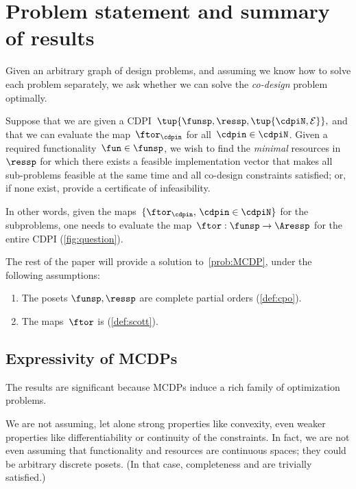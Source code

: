 

\section{Problem statement and summary of results}
\label{sec:Optimization}

Given an arbitrary graph of design problems, and assuming we know
how to solve each problem separately, we ask whether we can solve
the \emph{co-design} problem optimally.
\begin{problem}
    \label{prob:MCDP}Suppose that we are given a CDPI~$\tup{ \funsp,\ressp,\tup{ \cdpiN,\mathcal{E}} } ,$
    and that we can evaluate the map~$\ftor_{\cdpin}$ for all~$\cdpin\in\cdpiN$.
    Given a required functionality~$\fun\in\funsp$, we wish to find
    the \emph{minimal} resources in~$\ressp$ for which there exists
    a feasible implementation vector that makes all sub-problems feasible
    at the same time and all co-design constraints satisfied; or, if
    none exist, provide a certificate of infeasibility.
\end{problem}
In other words, given the maps~$\{\ftor_{\cdpin},\,\cdpin\in\cdpiN\}$
for the subproblems, one needs to evaluate the map~$\ftor:\funsp\rightarrow\Aressp$
for the entire CDPI (\cref{fig:question}).


The rest of the paper will provide a solution to~\cref{prob:MCDP},
under the following assumptions:

\begin{enumerate}
    \item The posets $\funsp,\ressp$ are complete partial orders (\cref{def:cpo}).
    \item The maps~$\ftor$ is \scottcontinuous (\cref{def:scott}).
\end{enumerate}

\subsection{Expressivity of MCDPs}

The results are significant because MCDPs induce a rich family of
optimization problems.

We are not assuming, let alone strong properties like convexity, even
weaker properties like differentiability or continuity of the constraints.
In fact, we are not even assuming that functionality and resources
are continuous spaces; they could be arbitrary discrete posets. (In
that case, completeness and \scottcontinuity are trivially satisfied.)

